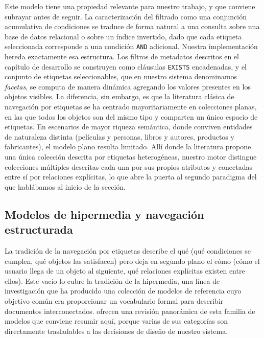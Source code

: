 Este modelo tiene una propiedad relevante para nuestro trabajo, y que conviene subrayar antes de seguir.
La caracterización del filtrado como una conjunción acumulativa de condiciones se traduce de forma
natural a una consulta sobre una base de datos relacional o sobre un índice invertido, dado que cada
etiqueta seleccionada corresponde a una condición \texttt{AND} adicional. Nuestra implementación
hereda exactamente esa estructura. Los filtros de metadatos descritos en el capítulo de
desarrollo se construyen como cláusulas \texttt{EXISTS} encadenadas, y el conjunto de etiquetas
seleccionables, que en nuestro sistema denominamos \textit{facetas}, se computa de manera dinámica
agregando los valores presentes en los objetos visibles. La diferencia, sin embargo, es que la literatura
clásica de navegación por etiquetas se ha centrado mayoritariamente en colecciones planas, en las que
todos los objetos son del mismo tipo y comparten un único espacio de etiquetas. En escenarios de
mayor riqueza semántica, donde conviven entidades de naturaleza distinta (películas y personas, libros
y autores, productos y fabricantes), el modelo plano resulta limitado. Allí donde la literatura propone
una única colección descrita por etiquetas heterogéneas, nuestro motor distingue colecciones múltiples
descritas cada una por sus propios atributos y conectadas entre sí por relaciones explícitas, lo que abre
la puerta al segundo paradigma del que hablábamos al inicio de la sección.

\subsection{Modelos de hipermedia y navegación estructurada}
\label{subsec:hypermedia}

La tradición de la navegación por etiquetas describe el qué (qué condiciones se cumplen, qué objetos
las satisfacen) pero deja en segundo plano el cómo (cómo el usuario llega de un objeto al siguiente, qué
relaciones explícitas existen entre ellos). Este vacío lo cubre la tradición de la hipermedia, una línea de
investigación que ha producido una colección de modelos de referencia cuyo objetivo común era
proporcionar un vocabulario formal para describir documentos interconectados. \citet{gruzman2000hypermedia}
ofrecen una revisión panorámica de esta familia de modelos que conviene resumir aquí, porque
varias de sus categorías son directamente trasladables a las decisiones de diseño de nuestro sistema.

